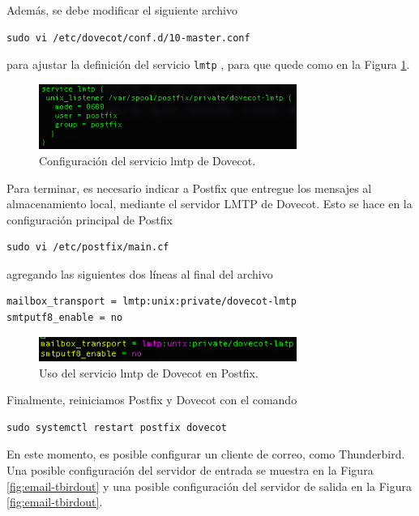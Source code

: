 \documentclass{article}
\newcommand{\ttt}[1]{%
\texttt{#1}%
}
\begin{document}
Adem\'as, se debe modificar el siguiente archivo
\begin{lstlisting}
sudo vi /etc/dovecot/conf.d/10-master.conf
\end{lstlisting}
para ajustar la definici\'on del servicio \ttt{lmtp},
para que quede como en la Figura \ref{fig:email-lmtp}.

\begin{figure}[H]
  \centering
  \includegraphics[width=0.75\textwidth]{email/lmtp}
  \caption{Configuraci\'on del servicio lmtp de Dovecot.}
  \label{fig:email-lmtp}
\end{figure}

Para terminar, es necesario indicar a Postfix que
entregue los mensajes al almacenamiento local,
mediante el servidor LMTP de Dovecot.   Esto se
hace en la configuraci\'on principal de Postfix
\begin{lstlisting}
sudo vi /etc/postfix/main.cf
\end{lstlisting}
agregando las siguientes dos l\'ineas al final
del archivo
\begin{lstlisting}
mailbox_transport = lmtp:unix:private/dovecot-lmtp
smtputf8_enable = no
\end{lstlisting}

\begin{figure}[H]
  \centering
  \includegraphics[width=0.75\textwidth]{email/lmtp2}
  \caption{Uso del servicio lmtp de Dovecot en Postfix.}
  \label{fig:email-lmtp2}
\end{figure}

Finalmente, reiniciamos Postfix y Dovecot con
el comando
\begin{lstlisting}
sudo systemctl restart postfix dovecot
\end{lstlisting}

En este momento, es posible configurar un cliente
de correo, como Thunderbird.   Una posible
configuraci\'on del servidor de entrada se
muestra en la Figura \ref{fig:email-tbirdout}
y una posible configuraci\'on del servidor
de salida en la Figura \ref{fig:email-tbirdout}.
\end{document}
